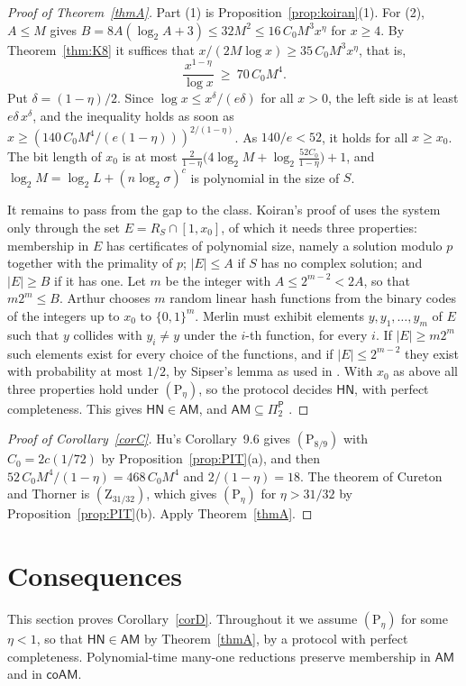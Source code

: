 \documentclass[11pt]{amsart}
\theoremstyle{definition}
\theoremstyle{remark}
\newcommand{\cl}[1]{\mathsf{#1}}
\newcommand{\HN}{\cl{HN}}
\newcommand{\AM}{\cl{AM}}
\newcommand{\Pitwo}{\Pi_2^{\cl P}}
\newcommand{\Zh}[1]{(\mathrm Z_{#1})}
\newcommand{\Ph}[1]{(\mathrm P_{#1})}
\begin{document}
\begin{proof}[Proof of Theorem~\ref{thmA}]
Part (1) is Proposition~\ref{prop:koiran}(1). For (2), $A\le M$ gives $B=8A(\log_2A+3)\le32M^2\le16\,C_0M^3x^\eta$ for $x\ge4$. By Theorem~\ref{thm:K8} it suffices that $x/(2M\log x)\ge35\,C_0M^3x^\eta$, that is,
\[
 \frac{x^{1-\eta}}{\log x}\ \ge\ 70\,C_0M^4 .
\]
Put $\delta=(1-\eta)/2$. Since $\log x\le x^\delta/(e\delta)$ for all $x>0$, the left side is at least $e\delta\,x^{\delta}$, and the inequality holds as soon as $x\ge(140\,C_0M^4/(e(1-\eta)))^{2/(1-\eta)}$. As $140/e<52$, it holds for all $x\ge x_0$. The bit length of $x_0$ is at most $\frac2{1-\eta}\bigl(4\log_2M+\log_2\frac{52C_0}{1-\eta}\bigr)+1$, and $\log_2M=\log_2L+(n\log_2\sigma)^c$ is polynomial in the size of $S$.

It remains to pass from the gap to the class. Koiran's proof of \cite[Theorem~2, pp.~5--6]{K96b} uses the system only through the set $E=R_S\cap[1,x_0]$, of which it needs three properties: membership in $E$ has certificates of polynomial size, namely a solution modulo $p$ together with the primality of $p$; $|E|\le A$ if $S$ has no complex solution; and $|E|\ge B$ if it has one. Let $m$ be the integer with $A\le2^{m-2}<2A$, so that $m2^m\le B$. Arthur chooses $m$ random linear hash functions from the binary codes of the integers up to $x_0$ to $\{0,1\}^m$. Merlin must exhibit elements $y,y_1,\dots,y_m$ of $E$ such that $y$ collides with $y_i\ne y$ under the $i$-th function, for every $i$. If $|E|\ge m2^m$ such elements exist for every choice of the functions, and if $|E|\le2^{m-2}$ they exist with probability at most $1/2$, by Sipser's lemma as used in \cite[pp.~5--6]{K96b}. With $x_0$ as above all three properties hold under $\Ph\eta$, so the protocol decides $\HN$, with perfect completeness. This gives $\HN\in\AM$, and $\AM\subseteq\Pitwo$ \cite[abstract]{K96b}.
\end{proof}

\begin{proof}[Proof of Corollary~\ref{corC}]
Hu's Corollary~9.6 gives $\Ph{8/9}$ with $C_0=2c(1/72)$ by Proposition~\ref{prop:PIT}(a), and then $52\,C_0M^4/(1-\eta)=468\,C_0M^4$ and $2/(1-\eta)=18$. The theorem of Cureton and Thorner is $\Zh{31/32}$, which gives $\Ph\eta$ for $\eta>31/32$ by Proposition~\ref{prop:PIT}(b). Apply Theorem~\ref{thmA}.
\end{proof}

\section{Consequences}\label{sec:cons}
This section proves Corollary~\ref{corD}. Throughout it we assume $\Ph\eta$ for some $\eta<1$, so that $\HN\in\AM$ by Theorem~\ref{thmA}, by a protocol with perfect completeness. Polynomial-time many-one reductions preserve membership in $\AM$ and in $\cl{coAM}$.
\end{document}
